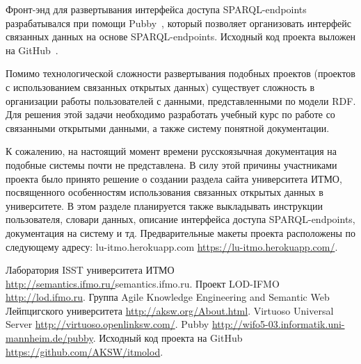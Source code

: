 \documentclass[10pt, a5paper]{article}
\begin{document}
Фронт-энд для развертывания интерфейса доступа SPARQL-endpoints разрабатывался при помощи Pubby~\cite{Radchenko5}, который позволяет организовать интерфейс связанных данных на основе SPARQL-endpoints. Исходный код проекта выложен на GitHub~\cite{Radchenko6}.

Помимо технологической сложности развертывания подобных проектов (проектов с использованием связанных открытых данных) существует сложность в организации работы пользователей с данными, представленными по модели RDF. Для решения этой задачи необходимо разработать учебный курс по работе со связанными открытыми данными, а также систему понятной документации.

К сожалению, на настоящий момент времени русскоязычная документация на подобные системы почти не представлена. В силу этой причины участниками проекта было принято решение о создании раздела сайта университета ИТМО, посвященного особенностям использования связанных открытых данных в университете. В этом разделе планируется также выкладывать инструкции пользователя, словари данных, описание интерфейса доступа SPARQL-endpoints, документация на систему и тд. Предварительные макеты проекта расположены по следующему адресу: lu-itmo.herokuapp.com \url{https://lu-itmo.herokuapp.com/}.

\begin{thebibliography}{99}
 Лаборатория ISST университета ИТМО \url{http://semantics.ifmo.ru/}{semantics.ifmo.ru}.
 Проект LOD-IFMO \url{http://lod.ifmo.ru}.
 Группа Agile Knowledge Engineering and Semantic Web Лейпцигского университета \url{http://aksw.org/About.html}.
 Virtuoso Universal Server \url{http://virtuoso.openlinksw.com/}.
 Pubby \url{http://wifo5-03.informatik.uni-mannheim.de/pubby}.
 Исходный код проекта на GitHub \url{https://github.com/AKSW/itmolod}.
\end{thebibliography}
\end{document}
